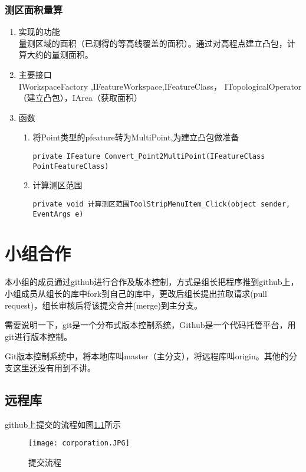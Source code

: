 \documentclass[twoside,color=blue,mathpazo,titlestyle=hang,12pt]{elegantbook}
\numberwithin{equation}{section}
\begin{document}
\subsection{测区面积量算}
\begin{enumerate}
\item 实现的功能\\
量测区域的面积（已测得的等高线覆盖的面积）。通过对高程点建立凸包，计算大约的量测面积。
\item 主要接口\\IWorkspaceFactory ,IFeatureWorkspace,IFeatureClass，
ITopologicalOperator（建立凸包），IArea（获取面积）
\item 函数
\begin{enumerate}
\item 将Point类型的pfeature转为MultiPoint,为建立凸包做准备
\begin{lstlisting}
private IFeature Convert_Point2MultiPoint(IFeatureClass PointFeatureClass)
\end{lstlisting}
\item 计算测区范围
\begin{lstlisting}
private void 计算测区范围ToolStripMenuItem_Click(object sender, EventArgs e)
\end{lstlisting}
\end{enumerate}
\end{enumerate}



\chapter{小组合作}

本小组的成员通过github进行合作及版本控制，方式是组长把程序推到github上，小组成员从组长的库中fork到自己的库中，更改后组长提出拉取请求(pull request)，组长审核后将该提交合并(merge)到主分支。

需要说明一下，git是一个分布式版本控制系统，Github是一个代码托管平台，用git进行版本控制。

Git版本控制系统中，将本地库叫master（主分支），将远程库叫origin。其他的分支这里还没有用到不讲。

\section{远程库}

github上提交的流程如图\ref{fig:cor}所示
\begin{figure}[htbp]
\caption{提交流程}
\label{fig:cor}
\centering
\texttt{[image: corporation.JPG]}
\end{figure}
\end{document}
